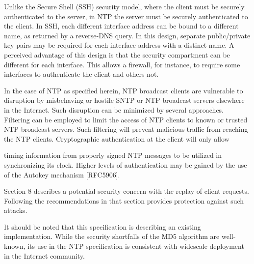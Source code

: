 Unlike the Secure Shell (SSH) security model, where the client must
be securely authenticated to the server, in NTP the server must be
securely authenticated to the client.  In SSH, each different
interface address can be bound to a different name, as returned by a
reverse-DNS query.  In this design, separate public/private key pairs
may be required for each interface address with a distinct name.  A
perceived advantage of this design is that the security compartment
can be different for each interface.  This allows a firewall, for
instance, to require some interfaces to authenticate the client and
others not.

In the case of NTP as specified herein, NTP broadcast clients are
vulnerable to disruption by misbehaving or hostile SNTP or NTP
broadcast servers elsewhere in the Internet.  Such disruption can be
minimized by several approaches.  Filtering can be employed to limit
the access of NTP clients to known or trusted NTP broadcast servers.
Such filtering will prevent malicious traffic from reaching the NTP
clients.  Cryptographic authentication at the client will only allow

timing information from properly signed NTP messages to be utilized
in synchronizing its clock.  Higher levels of authentication may be
gained by the use of the Autokey mechanism [RFC5906].

Section 8 describes a potential security concern with the replay of
client requests.  Following the recommendations in that section
provides protection against such attacks.

It should be noted that this specification is describing an existing
implementation.  While the security shortfalls of the MD5 algorithm
are well-known, its use in the NTP specification is consistent with
widescale deployment in the Internet community.

